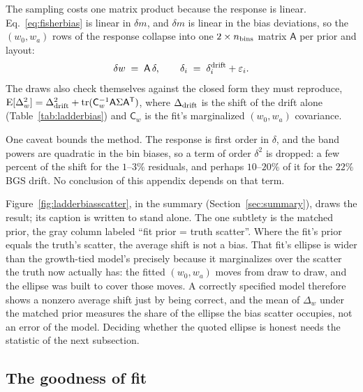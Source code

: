 \documentclass[11pt]{article}
\newcommand{\Cov}{\mathsf{C}}
\newcommand{\T}{^{\mathsf{T}}}
\begin{document}
The sampling costs one matrix product because the response is
linear.  Eq.~\eqref{eq:fisherbias} is linear in $\delta m$, and
$\delta m$ is linear in the bias deviations, so the $(w_0, w_a)$
rows of the response collapse into one
$2 \times n_{\rm bins}$ matrix $\mathsf{A}$ per prior and layout:
\begin{equation}
  \delta w \;=\; \mathsf{A}\,\delta,
  \qquad
  \delta_i \;=\; \delta_i^{\rm drift} + \varepsilon_i .
  \label{eq:linearmap}
\end{equation}
The draws also check themselves against the closed form they must
reproduce,
$\mathrm{E}[\Delta_w^2] = \Delta_{\rm drift}^2
+ \mathrm{tr}(\Cov_w^{-1} \mathsf{A} \Sigma \mathsf{A}\T)$, where
$\Delta_{\rm drift}$ is the shift of the drift alone
(Table~\ref{tab:ladderbias}) and $\Cov_w$ is the fit's marginalized
$(w_0, w_a)$ covariance.

One caveat bounds the method.  The response is first order in
$\delta$, and the band powers are quadratic in the bin biases, so a
term of order $\delta^2$ is dropped: a few percent of the shift for
the $1$--$3\%$ residuals, and perhaps $10$--$20\%$ of it for the
$22\%$ BGS drift.  No conclusion of this appendix depends on that
term.

Figure~\ref{fig:ladderbiasscatter}, in the summary
(Section~\ref{sec:summary}), draws the result; its caption is
written to stand alone.  The one subtlety is the matched prior, the
gray column labeled ``fit prior = truth scatter''.  Where the fit's
prior equals the truth's scatter, the average shift is not a bias.
That fit's ellipse is wider than the growth-tied model's precisely because
it marginalizes over the scatter the truth now actually has: the
fitted $(w_0, w_a)$ moves from draw to draw, and the ellipse was
built to cover those moves.  A correctly specified model therefore
shows a nonzero average shift just by being correct, and the mean of
$\Delta_w$ under the matched prior measures the share of the ellipse the
bias scatter occupies, not an error of the model.  Deciding whether
the quoted ellipse is honest needs the statistic of the next
subsection.

\subsection{The goodness of fit}
\label{sec:inflation}
\end{document}
